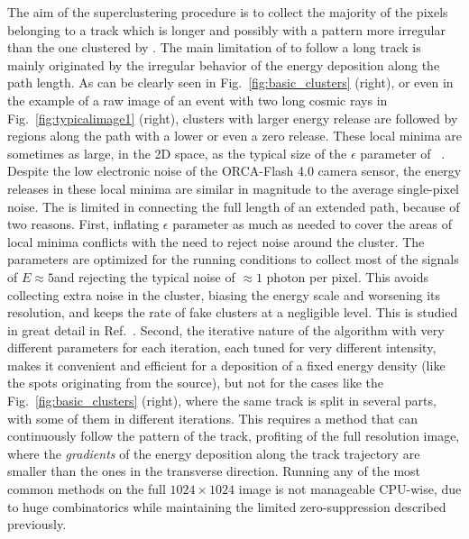 The aim of the superclustering procedure is to collect the majority of
the pixels belonging to a track which is longer and possibly with a pattern
more irregular than the one clustered by \idbscan. The main limitation
of  \idbscan to follow a long track is mainly originated by the irregular behavior of the energy
deposition along the path length.  As can be clearly seen in
Fig.~\ref{fig:basic_clusters} (right), or even in the example of a raw
image of an event with two long cosmic rays in
Fig.~\ref{fig:typicalimage1} (right), clusters with larger energy
release are followed by regions along the path with a lower or even a
zero release.  These local minima are sometimes as large, in the 2D
space, as the typical size of the $\epsilon$ parameter of
\dbscan~\cite{dbscan}. Despite the low electronic noise of the
ORCA-Flash 4.0 camera sensor, the energy releases in these local
minima are similar in magnitude to the average single-pixel noise.
The \idbscan is limited in connecting the full length of an extended
path, because of two reasons. First, inflating $\epsilon$ parameter as
much as needed to cover the areas of local minima conflicts with the
need to reject noise around the cluster.  The \idbscan parameters are
optimized for the \lemon running conditions to collect most of the
signals of $E \approx 5$\keV and rejecting the typical noise of
$\approx 1$ photon per pixel. This avoids collecting extra noise in
the cluster, biasing the energy scale and worsening its resolution,
and keeps the rate of fake clusters at a negligible level.  This is
studied in great detail in Ref.~\cite{iDBSCAN}.  Second, the iterative
nature of the algorithm with very different parameters for each
iteration, each tuned for very different intensity, makes it
convenient and efficient for a deposition of a fixed energy density
(like the spots originating from the \fe source), but not for the cases
like the Fig.~\ref{fig:basic_clusters} (right), where the same track
is split in several parts, with some of them in different iterations.
This requires a method that can continuously follow the pattern of the
track, profiting of the full resolution image, where the {\it gradients} of
the energy deposition along the track trajectory are smaller than the
ones in the transverse direction. Running any of the most common
methods on the full $1024\times1024$ image is not manageable CPU-wise,
due to huge combinatorics while maintaining the limited zero-suppression
described previously.

